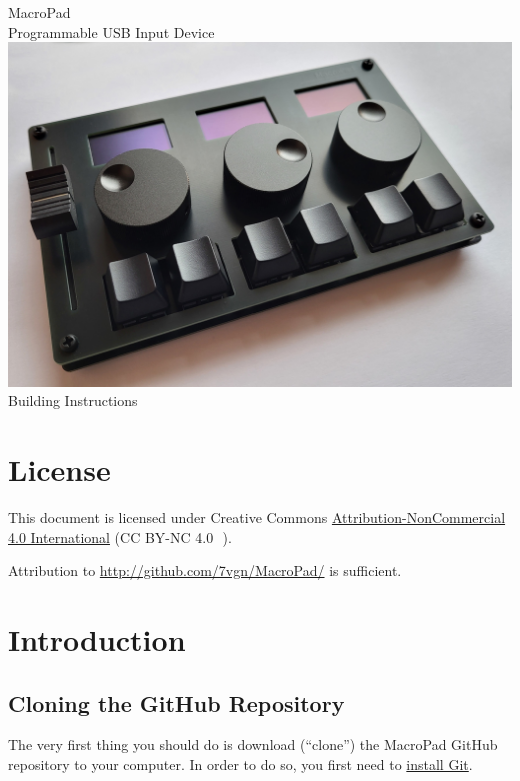 \documentclass{article}
\begin{document}
\hypersetup{pageanchor=false}
\begin{titlepage}
\thispagestyle{empty}
\centering
\textsf{\Huge MacroPad}\\[1cm]
\textsf{\Large Programmable USB Input Device}\\[3cm]
\includegraphics[width=\textwidth]{Images/Title.jpg}\\[3cm]
\textsf{\Large Building Instructions}
\end{titlepage}
\hypersetup{pageanchor=true}

\section*{License}
This document is licensed under Creative Commons \href{https://creativecommons.org/licenses/by-nc/4.0/}{Attribution-NonCommercial 4.0 International} (CC BY-NC 4.0 \ccCopy\,\ccAttribution\,\ccNonCommercial).

Attribution to \href{http://github.com/7vgn/MacroPad/}{http://github.com/7vgn/MacroPad/} is sufficient.

\tableofcontents

\section{Introduction}

\subsection{Cloning the GitHub Repository}\label{sec:gitclone}
The very first thing you should do is download (``clone'') the MacroPad GitHub repository to your computer. In order to do so, you first need to \href{https://git-scm.com/downloads}{install Git}.
\end{document}
